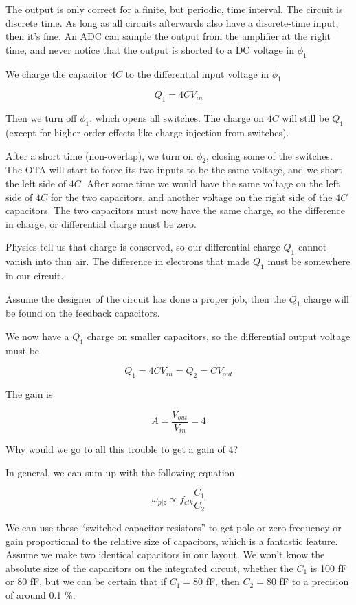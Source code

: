 The output is only correct for a finite, but periodic, time interval.
The circuit is discrete time. As long as all circuits afterwards also
have a discrete-time input, then it's fine. An ADC can sample the output
from the amplifier at the right time, and never notice that the output
is shorted to a DC voltage in \(\phi_1\)

We charge the capacitor \(4C\) to the differential input voltage in
\(\phi_1\)

\[ Q_1 = 4 C V_{in} \]

Then we turn off \(\phi_1\), which opens all switches. The charge on
\(4C\) will still be \(Q_1\) (except for higher order effects like
charge injection from switches).

After a short time (non-overlap), we turn on \(\phi_2\), closing some of
the switches. The OTA will start to force its two inputs to be the same
voltage, and we short the left side of \(4C\). After some time we would
have the same voltage on the left side of \(4C\) for the two capacitors,
and another voltage on the right side of the \(4C\) capacitors. The two
capacitors must now have the same charge, so the difference in charge,
or differential charge must be zero.

Physics tell us that charge is conserved, so our differential charge
\(Q_1\) cannot vanish into thin air. The difference in electrons that
made \(Q_1\) must be somewhere in our circuit.

Assume the designer of the circuit has done a proper job, then the
\(Q_1\) charge will be found on the feedback capacitors.

We now have a \(Q_1\) charge on smaller capacitors, so the differential
output voltage must be

\[ Q_1 = 4 C V_{in} = Q_2 = C V_{out} \]

The gain is

\[A = \frac{V_{out}}{V_{in}} = 4\]

Why would we go to all this trouble to get a gain of 4?

In general, we can sum up with the following equation.

\[\omega_{p\vert z} \propto f_{clk}\frac{C_1}{C_2}\]

We can use these ``switched capacitor resistors'' to get pole or zero
frequency or gain proportional to the relative size of capacitors, which
is a fantastic feature. Assume we make two identical capacitors in our
layout. We won't know the absolute size of the capacitors on the
integrated circuit, whether the \(C_1\) is 100 fF or 80 fF, but we can
be certain that if \(C_1 = 80\) fF, then \(C_2 = 80\) fF to a precision
of around 0.1 \%.

